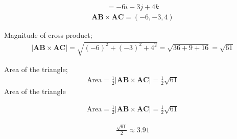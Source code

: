 \documentclass{beamer}
\theoremstyle{remark}
\let\vec\mathbf
\numberwithin{equation}{section}
\begin{document}
\begin{align}
= -6i - 3j + 4k
\end{align}
\begin{align}
\vec{AB} \times \vec{AC} = (-6, -3, 4)
\end{align}

Magnitude of cross product;
\begin{align}
|\vec{AB} \times \vec{AC}| = \sqrt{(-6)^2 + (-3)^2 + 4^2} 
= \sqrt{36 + 9 + 16} 
= \sqrt{61}
\end{align}

Area of the triangle;
\begin{align}
\text{Area} = \tfrac{1}{2} |\vec{AB} \times \vec{AC}|
= \tfrac{1}{2} \sqrt{61}
\end{align}
Area of the triangle

\begin{align}
\text{Area} = \tfrac{1}{2} \left| \vec{AB} \times \vec{AC} \right|
= \tfrac{1}{2} \sqrt{61}
\end{align}

\begin{align}
\frac{\sqrt{61}}{2} \approx 3.91
\end{align}
\end{document}
